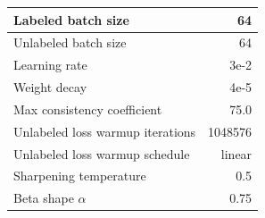 \begin{tabular}{L{\WWW}  R{\RRR}}
\\ \hline
Labeled batch size & 64
\\ \hline
Unlabeled batch size & 64
\\ \hline
Learning rate & 3e-2
\\ \hline
Weight decay & 4e-5
\\ \hline
Max consistency coefficient & 75.0
\\ \hline
Unlabeled loss warmup iterations & 1048576
\\ \hline
Unlabeled loss warmup schedule & linear
\\ \hline
Sharpening temperature & 0.5
\\ \hline
Beta shape $\alpha$ & 0.75
\end{tabular}
